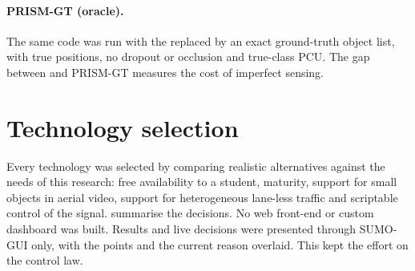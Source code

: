 \paragraph{PRISM-GT (oracle).} The same \prism{} code was run with the \vls{} replaced by an exact
ground-truth object list, with true positions, no dropout or occlusion and true-class PCU. The gap
between \prism{} and PRISM-GT measures the cost of imperfect sensing.

\section{Technology selection}\label{sec:impl-tech}

Every technology was selected by comparing realistic alternatives against the needs of this
research: free availability to a student, maturity, support for small objects in aerial video,
support for heterogeneous lane-less traffic and scriptable control of the signal.
 summarise the decisions. No web front-end or custom
dashboard was built. Results and live decisions were presented through SUMO-GUI only, with the
\vls{} points and the current \prism{} reason overlaid.  This kept the effort on the control law.

